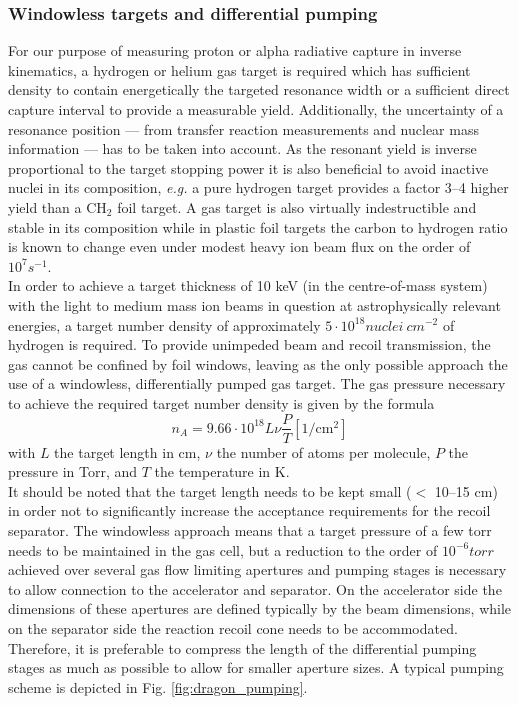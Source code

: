 \subsubsection{Windowless targets and differential pumping}


For our purpose of measuring proton or alpha radiative capture in inverse kinematics, a hydrogen or helium gas target is required which has sufficient density  to contain energetically the targeted resonance width or a sufficient direct capture interval to provide a measurable yield. Additionally, the uncertainty of a resonance position --- from transfer reaction measurements and nuclear mass information --- has to be taken into account. As the resonant yield is inverse proportional to the target stopping power it is also beneficial to avoid inactive nuclei in its composition, {\it e.g.} a pure hydrogen target provides a factor 3--4 higher yield than a CH$_2$ foil target.  A gas target is also virtually indestructible and stable in its composition while in plastic foil targets the carbon to hydrogen ratio is known to change even under modest heavy ion beam flux on the order of $10^7 \unit{s^{-1}}$.\\
In order to achieve a target thickness of 10 keV (in the centre-of-mass system) with the light to medium mass ion beams in question at astrophysically relevant energies, a target number density of approximately $5\cdot10^{18} \unit{nuclei~cm^{-2}}$ of hydrogen is required. To provide unimpeded beam and recoil transmission, the gas cannot be confined by foil windows, leaving as the only possible approach the use of a windowless, differentially pumped gas target. The gas pressure necessary to achieve the required target number density is given by the formula \cite{rolf88} 
\begin{equation}
n_A = 9.66\cdot10^{18} L \nu \frac{P}{T} \mathrm{[1/cm^2]}
\end{equation}
with $L$ the target length in cm, $\nu$ the number of atoms per molecule, $P$ the pressure in Torr, and $T$ the temperature in K.\\
It should be noted that the target length needs to be kept small ($<$ 10--15 cm) in order not to significantly increase the acceptance requirements for the recoil separator. The windowless approach means that a target pressure of a few torr needs to be maintained in the gas cell, but a reduction to the order of $10^{-6} \unit{torr}$ achieved over several gas flow limiting apertures and pumping stages is necessary to allow connection to the accelerator and separator. On the accelerator side the dimensions of these apertures are defined typically by the beam dimensions, while on the separator side the reaction recoil cone needs to be accommodated. Therefore, it is preferable to compress the length of the differential pumping stages as much as possible to allow for smaller aperture sizes. A typical pumping scheme is depicted in Fig. \ref{fig:dragon_pumping}.
